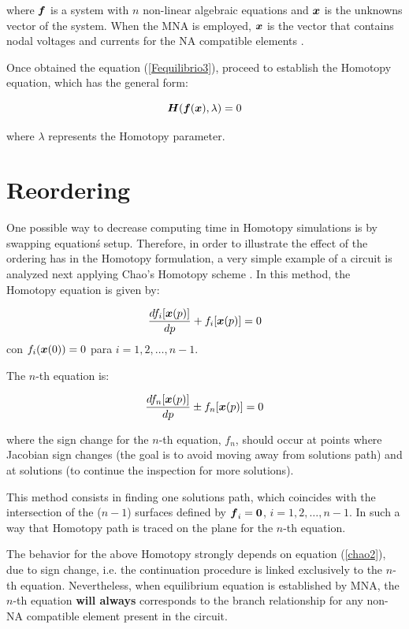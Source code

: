 \documentclass[conference,letterpaper,onecolumn,11pt]{IEEEtran}
\newcommand{\pig}[1]{\mbox{\boldmath ${#1}$}	}
\begin{document}
where $\pig{f}$ is a system with $n$ non-linear algebraic equations and $\pig{x}$ is the unknowns vector of the system. When the MNA is employed, $\pig{x}$ is the vector that contains nodal voltages and currents for the NA compatible elements \cite{Schwa_book}.

Once obtained the equation (\ref{Fequilibrio3}), proceed to establish the Homotopy equation, which has the general form:

\begin{equation}
\pig{H}(\pig{f}(\pig{x}),\lambda )=0
\label{homotopia3}
\end{equation}

where $\lambda$ represents the Homotopy parameter.

\section{Reordering}

One possible way to decrease computing time in Homotopy simulations is by swapping equation\'s setup. Therefore, in order to illustrate the effect of the ordering has in the Homotopy formulation, a very simple example of a circuit is analyzed next applying Chao's Homotopy scheme \cite{cont_kao}. In this method, the Homotopy equation is given by:

\begin{equation}
{ {{d f_i[\pig{x}(p)]} \over{dp}} + f_i[\pig{x}(p)]=0}
\label{chao}
\end{equation}
con $f_i(\pig{x}(0))=0$ para $i=1,2,\ldots,n-1$.

The $n$-th equation is:

\begin{equation}
{  {{d f_n [\pig{x}(p)]} \over {dp} } \pm f_n [\pig{x}(p)]=0}
\label{chao2}
\end{equation}

where the sign change for the $n$-th equation, $f_n$, should occur at points where Jacobian sign changes (the goal is to avoid moving away from solutions path) and at solutions (to continue the inspection for more solutions).

This method consists in finding one solutions path, which coincides with the intersection of the ($n-1$) surfaces defined by $\pig{f}_i=\pig{0}$, $i=1, 2, \ldots, n-1$. In such a way that Homotopy path is traced on the plane for the $n$-th equation.

The behavior for the above Homotopy strongly depends on equation (\ref{chao2}), due to sign change, i.e. the continuation procedure is linked exclusively to the $n$-th equation. Nevertheless, when equilibrium equation is established by MNA, the $n$-th equation {\bf will always} corresponds to the branch relationship for any non-NA compatible element present in the circuit.
\end{document}
